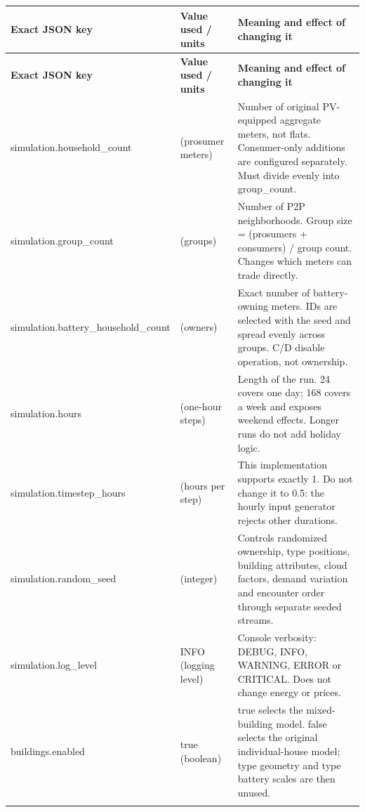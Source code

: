 \documentclass[a4paper,11pt]{article}
\begin{document}
\begingroup\small
\begin{longtable}{>{\RaggedRight\arraybackslash}p{}>{\RaggedRight\arraybackslash}p{}>{\RaggedRight\arraybackslash}p{}}
\toprule
\textbf{Exact JSON key} & \textbf{Value used / units} & \textbf{Meaning and effect of changing it} \\ \midrule
\endfirsthead
\toprule
\textbf{Exact JSON key} & \textbf{Value used / units} & \textbf{Meaning and effect of changing it} \\ \midrule
\endhead
simulation.\allowbreak{}household\_\allowbreak{}count & 100 (prosumer meters) & Number of original PV-equipped aggregate meters, not flats.\allowbreak{} Consumer-only additions are configured separately.\allowbreak{} Must divide evenly into group\_\allowbreak{}count.\allowbreak{} \\ \addlinespace[3pt]
simulation.\allowbreak{}group\_\allowbreak{}count & 10 (groups) & Number of P2P neighborhoods. Group size = (prosumers + consumers) / group count. Changes which meters can trade directly. \\ \addlinespace[3pt]
simulation.\allowbreak{}battery\_\allowbreak{}household\_\allowbreak{}count & 55 (owners) & Exact number of battery-owning meters. IDs are selected with the seed and spread evenly across groups. C/D disable operation, not ownership. \\ \addlinespace[3pt]
simulation.hours & 24 (one-hour steps) & Length of the run. 24 covers one day; 168 covers a week and exposes weekend effects. Longer runs do not add holiday logic. \\ \addlinespace[3pt]
simulation.\allowbreak{}timestep\_\allowbreak{}hours & 1 (hours per step) & This implementation supports exactly 1. Do not change it to 0.5: the hourly input generator rejects other durations. \\ \addlinespace[3pt]
simulation.\allowbreak{}random\_\allowbreak{}seed & 42 (integer) & Controls randomized ownership, type positions, building attributes, cloud factors, demand variation and encounter order through separate seeded streams. \\ \addlinespace[3pt]
simulation.\allowbreak{}log\_\allowbreak{}level & INFO (logging level) & Console verbosity: DEBUG, INFO, WARNING, ERROR or CRITICAL. Does not change energy or prices. \\ \addlinespace[3pt]
buildings.enabled & true (boolean) & true selects the mixed-building model. false selects the original individual-house model; type geometry and type battery scales are then unused. \\ \addlinespace[3pt]

\end{longtable}
\end{document}
